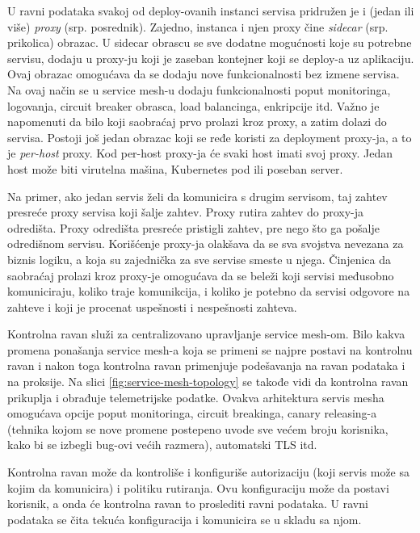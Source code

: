 \documentclass[a4paper,12pt]{report}
\begin{document}
U ravni podataka svakoj od deploy-ovanih instanci servisa pridružen je i (jedan ili više) \textit{proxy} (srp. posrednik). Zajedno, instanca i njen proxy čine \textit{sidecar} (srp. prikolica) obrazac.  U sidecar obrascu se sve dodatne mogućnosti koje su potrebne servisu, dodaju u proxy-ju koji je zaseban kontejner koji se deploy-a uz aplikaciju. Ovaj obrazac omogućava da se dodaju nove funkcionalnosti bez izmene servisa. Na ovaj način se u service mesh-u dodaju funkcionalnosti poput monitoringa, logovanja, circuit breaker obrasca, load balancinga, enkripcije itd. Važno je napomenuti da bilo koji saobraćaj prvo prolazi kroz proxy, a zatim dolazi do servisa. Postoji još jedan obrazac koji se ređe koristi za deployment proxy-ja, a to je \textit{per-host} proxy. Kod per-host proxy-ja će svaki host imati svoj proxy. Jedan host može biti virutelna mašina, Kubernetes pod ili poseban server.  \newline

Na primer, ako jedan servis želi da komunicira s drugim servisom, taj zahtev presreće proxy servisa koji šalje zahtev. Proxy rutira zahtev do proxy-ja odredišta. Proxy odredišta presreće pristigli zahtev, pre nego što ga pošalje odredišnom servisu. Korišćenje proxy-ja olakšava da se sva svojstva nevezana za biznis logiku, a koja su zajednička za sve servise smeste u njega. Činjenica da saobraćaj prolazi kroz proxy-je omogućava da se beleži koji servisi međusobno komuniciraju, koliko traje komunikcija, i koliko je potebno da servisi odgovore na zahteve i koji je procenat uspešnosti i nespešnosti zahteva. \newline

Kontrolna ravan služi za centralizovano upravljanje service mesh-om. Bilo kakva promena ponašanja service mesh-a koja se primeni se najpre postavi na kontrolnu ravan i nakon toga kontrolna ravan primenjuje podešavanja na ravan podataka i na proksije. Na slici \ref{fig:service-mesh-topology} se takođe vidi da kontrolna ravan prikuplja i obrađuje telemetrijske podatke. Ovakva arhitektura servis mesha omogućava opcije poput monitoringa, circuit breakinga, canary releasing-a (tehnika kojom se nove promene postepeno uvode sve većem broju korisnika, kako bi se izbegli bug-ovi većih razmera), automatski TLS itd. \newline

Kontrolna ravan može da kontroliše i konfiguriše autorizaciju (koji servis može sa kojim da komunicira) i politiku rutiranja. Ovu konfiguraciju može da postavi korisnik, a onda će kontrolna ravan to proslediti ravni podataka. U ravni podataka se čita tekuća konfiguracija i komunicira se u skladu sa njom. \newline
\end{document}
